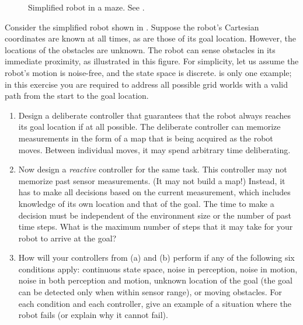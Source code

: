 \begin{figure}[t]
\caption{Simplified robot in a maze. See \protect{}.}
\label{FigEx3}
\end{figure} 

\begin{exercise}%
Consider the simplified robot shown in
.  Suppose the robot's Cartesian coordinates are
known at all times, as are those of its goal location. However, the
locations of the obstacles are unknown. The robot can sense obstacles
in its immediate proximity, as illustrated in this figure. For
simplicity, let us assume the robot's motion is noise-free, and the
state space is discrete.  is only one example; in
this exercise you are required to address all possible grid worlds
with a valid path from the start to the goal location.

\begin{enumerate}
\item Design a deliberate controller
that guarantees that the robot always reaches its goal
location if at all possible. The deliberate controller can memorize
measurements in the form of a map that is being acquired as the robot
moves. Between individual moves, it may spend arbitrary time
deliberating.

\item Now design a {\em reactive}
controller for the same task. This controller may not memorize past
sensor measurements. (It may not build a map!) Instead, it has to make
all decisions based on the current measurement, which includes
knowledge of its own location and that of the goal.  The time to make
a decision must be independent of the environment size or the number
of past time steps.  What is the maximum number of steps that it may
take for your robot to arrive at the goal?

\item
How will your controllers from (a) and (b) perform if any of the
following six conditions apply:
continuous state space,
noise in perception,
noise in motion,
noise in both perception and motion,
unknown location of the goal (the goal can be detected only when within sensor range),
or
moving obstacles. For each condition and each controller,
give an example of a situation where the robot fails (or explain why it cannot fail).
\end{enumerate}
\end{exercise} 

